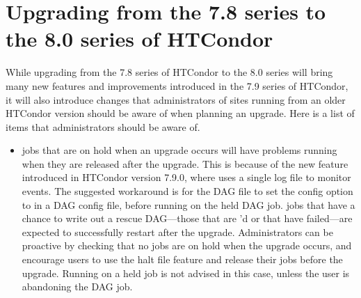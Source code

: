 \section{\label{sec:to-8.0}Upgrading from the 7.8 series to the 8.0 series of HTCondor}

While upgrading from the 7.8 series of HTCondor to the 8.0 series 
will bring many
new features and improvements introduced in the 7.9 series of HTCondor,
it will
also introduce changes that administrators of sites running from an older
HTCondor version should be aware of when planning an upgrade.  
Here is a list of items that administrators should be aware of.

\begin{itemize}

\item {} jobs that are on hold when an upgrade occurs will have
problems running when they are released after the upgrade. This is because of
the new feature introduced in HTCondor version 7.9.0, where 
uses a single log file to monitor events.  The suggested workaround is for the
DAG file to set the config option  to
 in a DAG config file, before running  on the held
DAG job.   jobs that have a chance to write out a rescue
DAG---those that are 'd or that have failed---are expected to
successfully restart after the upgrade. Administrators can be proactive by
checking that no  jobs are on hold when the upgrade occurs, and
encourage users to use the halt file feature and release their 
jobs before the upgrade.  Running  on a held  job is
not advised in this case, unless the user is abandoning the DAG job.

\end{itemize}

